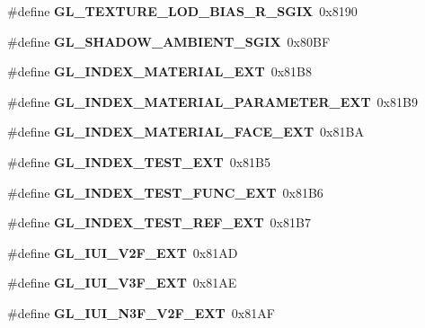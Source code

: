 \begin{DoxyCompactItemize}
\item 
\#define {\bfseries G\+L\+\_\+\+T\+E\+X\+T\+U\+R\+E\+\_\+\+L\+O\+D\+\_\+\+B\+I\+A\+S\+\_\+\+R\+\_\+\+S\+G\+I\+X}~0x8190\label{_s_d_l__opengl_8h_afc2386b83aa1de15081dd3d33260316d}

\item 
\#define {\bfseries G\+L\+\_\+\+S\+H\+A\+D\+O\+W\+\_\+\+A\+M\+B\+I\+E\+N\+T\+\_\+\+S\+G\+I\+X}~0x80\+B\+F\label{_s_d_l__opengl_8h_a400a75350f09c742a62f776b511e74ae}

\item 
\#define {\bfseries G\+L\+\_\+\+I\+N\+D\+E\+X\+\_\+\+M\+A\+T\+E\+R\+I\+A\+L\+\_\+\+E\+X\+T}~0x81\+B8\label{_s_d_l__opengl_8h_a4fd373ccfb9a34547c50e932699d3854}

\item 
\#define {\bfseries G\+L\+\_\+\+I\+N\+D\+E\+X\+\_\+\+M\+A\+T\+E\+R\+I\+A\+L\+\_\+\+P\+A\+R\+A\+M\+E\+T\+E\+R\+\_\+\+E\+X\+T}~0x81\+B9\label{_s_d_l__opengl_8h_adf0b5a0deef0348394f36e5a35ae173d}

\item 
\#define {\bfseries G\+L\+\_\+\+I\+N\+D\+E\+X\+\_\+\+M\+A\+T\+E\+R\+I\+A\+L\+\_\+\+F\+A\+C\+E\+\_\+\+E\+X\+T}~0x81\+B\+A\label{_s_d_l__opengl_8h_a85c6541bd6dc828d9f3ffdef53854cf7}

\item 
\#define {\bfseries G\+L\+\_\+\+I\+N\+D\+E\+X\+\_\+\+T\+E\+S\+T\+\_\+\+E\+X\+T}~0x81\+B5\label{_s_d_l__opengl_8h_a39e66d637dfb543ffa841ef1b04ac91a}

\item 
\#define {\bfseries G\+L\+\_\+\+I\+N\+D\+E\+X\+\_\+\+T\+E\+S\+T\+\_\+\+F\+U\+N\+C\+\_\+\+E\+X\+T}~0x81\+B6\label{_s_d_l__opengl_8h_a5eaf7b6be627ea8e6b35be8b24c27138}

\item 
\#define {\bfseries G\+L\+\_\+\+I\+N\+D\+E\+X\+\_\+\+T\+E\+S\+T\+\_\+\+R\+E\+F\+\_\+\+E\+X\+T}~0x81\+B7\label{_s_d_l__opengl_8h_a01b7c950176b6f9cc4cad91ff9c5cce5}

\item 
\#define {\bfseries G\+L\+\_\+\+I\+U\+I\+\_\+\+V2\+F\+\_\+\+E\+X\+T}~0x81\+A\+D\label{_s_d_l__opengl_8h_a88e50cbad9cb42fc29d1f8c4d6e42384}

\item 
\#define {\bfseries G\+L\+\_\+\+I\+U\+I\+\_\+\+V3\+F\+\_\+\+E\+X\+T}~0x81\+A\+E\label{_s_d_l__opengl_8h_a3f577835259a490f499ab9162724353a}

\item 
\#define {\bfseries G\+L\+\_\+\+I\+U\+I\+\_\+\+N3\+F\+\_\+\+V2\+F\+\_\+\+E\+X\+T}~0x81\+A\+F\label{_s_d_l__opengl_8h_a63b0d319f24b24efd1f8259717d4d147}


\end{DoxyCompactItemize}
